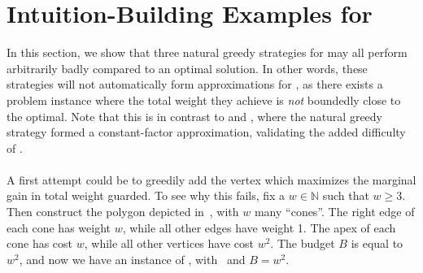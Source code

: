 \section{Intuition-Building Examples for \BMVVG{}}
In this section, we show that three natural greedy strategies for \BMVVG{} may all perform arbitrarily badly compared to an optimal solution. In other words, these strategies will not automatically form approximations for \BMVVG{}, as there exists a problem instance where the total weight they achieve is \emph{not} boundedly close to the optimal. Note that this is in contrast to \MLVG{} and \MVVG{}, where the natural greedy strategy formed a constant-factor approximation, validating the added difficulty of \BMVVG{}. \\\\
A first attempt could be to greedily add the vertex which maximizes the marginal gain in total weight guarded. To see why this fails, fix a $w\in\mathbb{N}$ such that $w\geq 3$. Then construct the polygon depicted in~, with $w$ many ``cones''. The right edge of each cone has weight $w$, while all other edges have weight 1. The apex of each cone has cost $w$, while all other vertices have cost $w^2$. The budget $B$ is equal to $w^2$, and now we have an instance of \BMVVG{}, with~ and $B=w^2$.
